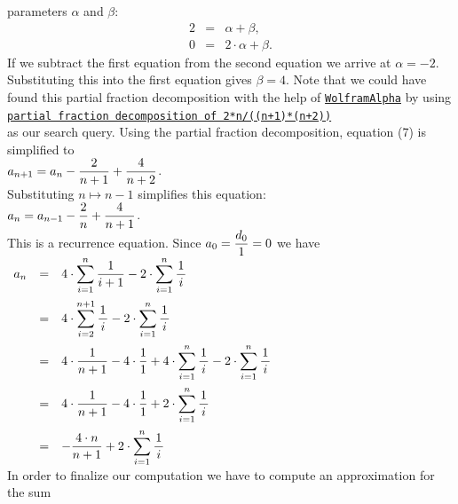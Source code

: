 parameters $\alpha$ and $\beta$:
\begin{eqnarray*}
  2 & = & \alpha + \beta, \\
  0 & = & 2 \cdot \alpha + \beta.
\end{eqnarray*}
If we subtract the first equation from the second equation we arrive at
$\alpha = -2$.  Substituting this into the first equation gives $\beta = 4$.
Note that we could have found this partial fraction decomposition with the help of
\href{https://www.wolframalpha.com}{\texttt{WolframAlpha}} by using
\\[0.2cm]
\hspace*{1.3cm}
\href{https://www.wolframalpha.com/input?i=partial+fraction+decomposition+of+2*n%2F%28%28n%2B1%29*%28n%2B2%29%29}{\texttt{partial fraction decomposition of 2*n/((n+1)*(n+2))}}
\\[0.2cm]
as our search query.  Using the partial fraction decomposition,  equation (7) is simplified to
\\[0.2cm]
\hspace*{1.3cm}
$\displaystyle a_{n+1} = a_{n} - \frac{2}{n+1} + \frac{4}{n+2}$.
\\[0.2cm] 
Substituting $n \mapsto n-1$ simplifies this equation: 
\\[0.2cm]
\hspace*{1.3cm}
$\displaystyle a_{n} = a_{n-1} - \frac{2}{n} + \frac{4}{n+1}$.
\\[0.2cm] 
This is a  recurrence equation. 
Since $a_0 = \displaystyle\frac{d_0}{1} = 0$
we have
\\[0.2cm]
\hspace*{1.3cm}
$
\begin{array}{lcl}
 a_{n} & = & \displaystyle 4 \cdot \sum_{i=1}^n \frac{1}{i+1} - 2 \cdot \sum_{i=1}^n \frac{1}{\,i\,} \\[0.5cm]
       & = & \displaystyle 4 \cdot \sum_{i=2}^{n+1} \frac{1}{\,i\,} - 2 \cdot \sum_{i=1}^n \frac{1}{\,i\,} \\[0.5cm]
       & = & \displaystyle 4 \cdot \frac{1}{n+1} - 4 \cdot \frac{1}{1} + 4 \cdot \sum_{i=1}^{n} \frac{1}{\,i\,} - 2 \cdot \sum_{i=1}^n \frac{1}{\,i\,} \\[0.5cm]
       & = & \displaystyle 4 \cdot \frac{1}{n+1} - 4 \cdot \frac{1}{1} + 2 \cdot \sum_{i=1}^{n} \frac{1}{\,i\,}  \\[0.5cm]
       & = & \displaystyle - \frac{4 \cdot n}{n+1}  + 2 \cdot \sum_{i=1}^{n} \frac{1}{\,i\,}  
\end{array}
$
\\[0.2cm]
In order to finalize our computation we have to compute an approximation for the sum
